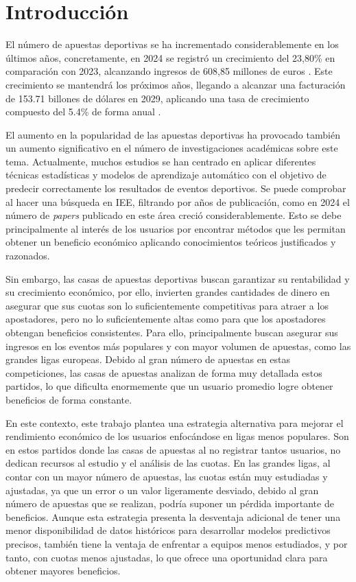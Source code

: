 \section{Introducción}

El número de apuestas deportivas se ha incrementado considerablemente en los últimos años, concretamente, en 2024 se registró un crecimiento del 23,80\% en comparación con 2023, alcanzando ingresos de 608,85 millones de euros \cite{casinos2024}. Este crecimiento se mantendrá los próximos años, llegando a alcanzar una facturación de 153.71 billones de dólares en 2029, aplicando una tasa de crecimiento compuesto del 5.4\% de forma anual \cite{tbrc2025sportsbetting}.

El aumento en la popularidad de las apuestas deportivas ha provocado también un aumento significativo en el número de investigaciones académicas sobre este tema. Actualmente, muchos estudios se han centrado en aplicar diferentes técnicas estadísticas y modelos de aprendizaje automático con el objetivo de predecir correctamente los resultados de eventos deportivos. Se puede comprobar al hacer una búsqueda en IEE, filtrando por años de publicación, como en 2024 el número de \textit{papers} publicado en este área creció considerablemente. Esto se debe principalmente al interés de los usuarios por encontrar métodos que les permitan obtener un beneficio económico aplicando conocimientos teóricos justificados y razonados.

Sin embargo, las casas de apuestas deportivas buscan garantizar su rentabilidad y su crecimiento económico, por ello, invierten grandes cantidades de dinero en asegurar que sus cuotas son lo suficientemente competitivas para atraer a los apostadores, pero no lo suficientemente altas como para que los apostadores obtengan beneficios consistentes. Para ello, principalmente buscan asegurar sus ingresos en los eventos más populares y con mayor volumen de apuestas, como las grandes ligas europeas. Debido al gran número de apuestas en estas competiciones, las casas de apuestas analizan de forma muy detallada estos partidos, lo que dificulta enormemente que un usuario promedio logre obtener beneficios de forma constante.

En este contexto, este trabajo plantea una estrategia alternativa para mejorar el rendimiento económico de los usuarios enfocándose en ligas menos populares. Son en estos partidos donde las casas de apuestas al no registrar tantos usuarios, no dedican recursos al estudio y el análisis de las cuotas. En las grandes ligas, al contar con un mayor número de apuestas, las cuotas están muy estudiadas y ajustadas, ya que un error o un valor ligeramente desviado, debido al gran número de apuestas que se realizan, podría suponer un pérdida importante de beneficios. Aunque esta estrategia presenta la desventaja adicional de tener una menor disponibilidad de datos históricos para desarrollar modelos predictivos precisos, también tiene la ventaja de enfrentar a equipos menos estudiados, y por tanto, con cuotas menos ajustadas, lo que ofrece una oportunidad clara para obtener mayores beneficios. 


